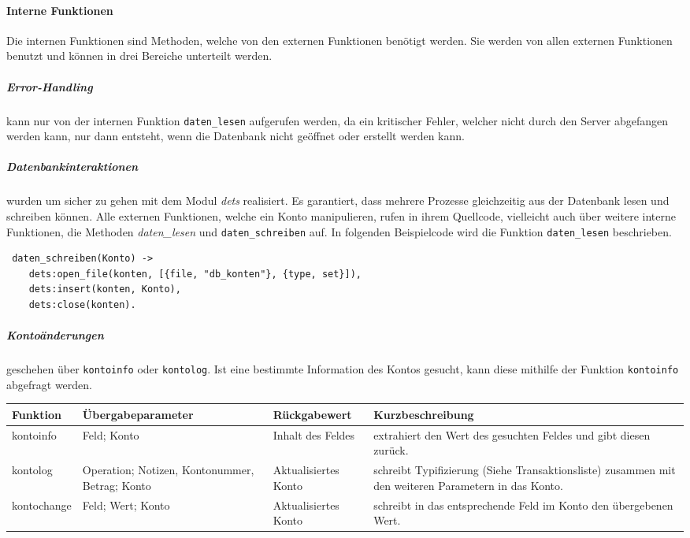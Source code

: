 \paragraph{Interne Funktionen}
Die internen Funktionen sind Methoden, welche von den externen Funktionen benötigt werden. Sie werden von allen externen Funktionen benutzt und können in drei Bereiche unterteilt werden.
\subparagraph{Error-Handling}
 kann nur von der internen Funktion \texttt{daten\_lesen} aufgerufen werden, da ein kritischer Fehler, welcher nicht durch den Server abgefangen werden kann, nur dann entsteht, wenn die Datenbank nicht geöffnet oder erstellt werden kann.
\subparagraph{Datenbankinteraktionen} wurden um sicher zu gehen mit dem Modul \textit{dets} realisiert. Es garantiert, dass mehrere Prozesse gleichzeitig aus der Datenbank lesen und schreiben können. Alle externen Funktionen, welche ein Konto manipulieren, rufen in ihrem Quellcode, vielleicht auch über weitere interne Funktionen, die Methoden \textit{daten\_lesen} und \texttt{daten\_schreiben} auf. In folgenden Beispielcode wird die Funktion \texttt{daten\_lesen} beschrieben.
\begin{lstlisting}
 daten_schreiben(Konto) -> 
 	dets:open_file(konten, [{file, "db_konten"}, {type, set}]),
 	dets:insert(konten, Konto),
 	dets:close(konten).	
\end{lstlisting}
\subparagraph{Kontoänderungen} geschehen über \texttt{kontoinfo} oder \texttt{kontolog}. Ist eine bestimmte Information des Kontos gesucht, kann diese mithilfe der Funktion \texttt{kontoinfo} abgefragt werden.
\\
\begin{center}
\begin{tabular}{p{3 cm}|p{3 cm}|p{3 cm}|p{5 cm}}
Funktion & Übergabeparameter & Rückgabewert & Kurzbeschreibung \\
				\hline
				\hline
kontoinfo & 
Feld; Konto & 
Inhalt des Feldes & 
extrahiert den Wert des gesuchten Feldes und gibt diesen zurück.\\ \hline

kontolog & 
Operation; {Notizen, Kontonummer, Betrag}; Konto & 
Aktualisiertes Konto & 
schreibt Typifizierung (Siehe Transaktionsliste) zusammen mit den weiteren Parametern in das Konto.\\ \hline

kontochange & 
Feld; Wert; Konto & 
Aktualisiertes Konto & 
schreibt in das entsprechende Feld im Konto den übergebenen Wert.\\ \hline
\end{tabular}\\
\end{center}
